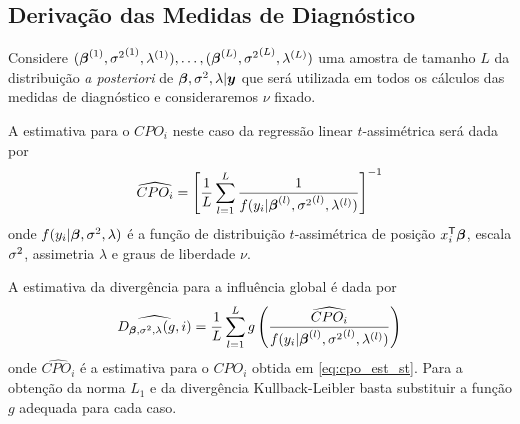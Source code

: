 \subsection{Derivação das Medidas de Diagnóstico}
Considere $({\boldsymbol{\beta}}^{(1)},{\sigma^2}^{(1)},\lambda^{(1)}),\ldots,
({\boldsymbol{\beta}}^{(L)},{\sigma^2}^{(L)},\lambda^{(L)})$ uma amostra de tamanho $L$ da distribuição \textit{a posteriori} de ${\boldsymbol{\beta}},\sigma^2,\lambda|{\boldsymbol{y}}$ que será utilizada em todos os cálculos das medidas de diagnóstico e consideraremos $\nu$ fixado.

A estimativa para o $CPO_i$ neste caso da regressão linear $t$-assimétrica será dada por
\begin{equation}\label{eq:cpo_est_st}
\widehat{CPO_i} = \left[\frac{1}{L}\sum_{l=1}^L\frac{1}{f(y_i|{\boldsymbol{\beta}}^{(l)},{\sigma^2}^{(l)},\lambda^{(l)})}\right]^{-1}
\end{equation}
onde $f(y_i|{\boldsymbol{\beta}},\sigma^2,\lambda)$ é a função de distribuição $t$-assimétrica de posição $x_i^{\mathsf{T}}{\boldsymbol{\beta}}$, escala $\sigma^2$, assimetria $\lambda$ e graus de liberdade $\nu$.

A estimativa da divergência para a influência global é dada por
\begin{equation}
\widehat{D_{{\boldsymbol{\beta}},\sigma^2,\lambda}(g,i)} = \frac{1}{L}\sum_{l=1}^L g\left(\frac{\widehat{CPO_i}}{f(y_i|{\boldsymbol{\beta}}^{(l)},{\sigma^2}^{(l)},\lambda^{(l)})}\right)
\end{equation}
onde $\widehat{CPO_i}$ é a estimativa para o $CPO_i$ obtida em \eqref{eq:cpo_est_st}. Para a obtenção da norma $L_1$ e da divergência Kullback-Leibler basta substituir a função $g$ adequada para cada caso.

